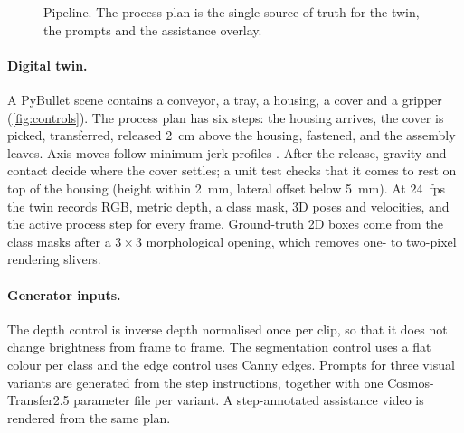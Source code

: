 \documentclass[11pt,a4paper]{article}
\begin{document}
\begin{figure}[t]
\centering
{}
\caption{Pipeline. The process plan is the single source of truth for the twin,
the prompts and the assistance overlay.}
\label{fig:pipeline}
\end{figure}

\paragraph{Digital twin.}
A PyBullet \cite{pybullet} scene contains a conveyor, a tray, a housing, a cover and a
gripper (\cref{fig:controls}). The process plan has six steps: the housing arrives, the cover is
picked, transferred, released \SI{2}{cm} above the housing, fastened, and the
assembly leaves. Axis moves follow minimum-jerk profiles \cite{flash1985}. After the release,
gravity and contact decide where the cover settles; a unit test checks that it comes to rest
on top of the housing (height within \SI{2}{mm}, lateral offset below \SI{5}{mm}). At \SI{24}{fps} the twin records RGB, metric depth,
a class mask, 3D poses and velocities, and the active process step for every frame.
Ground-truth 2D boxes come from the class masks after a $3\times3$ morphological opening,
which removes one- to two-pixel rendering slivers.

\paragraph{Generator inputs.}
The depth control is inverse depth normalised once per clip, so that it does not change
brightness from frame to frame. The segmentation control uses a flat colour per class and the
edge control uses Canny edges. Prompts for three visual variants are generated from the
step instructions, together with one Cosmos-Transfer2.5 parameter file per variant. A
step-annotated assistance video is rendered from the same plan.
\end{document}
